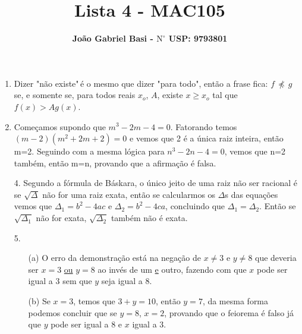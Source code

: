 \documentclass[12pt, a4paper]{article} %
\title{ \textbf{Lista 4 - MAC105}}
\date{}
\author{ \textbf{João Gabriel Basi - $\text{N}^\circ$ USP: 9793801}}
\begin{document}
\maketitle
\begin{enumerate}
\item
Dizer "não existe"$\,$é o mesmo que dizer "para todo", então a frase fica: $f\,\not\preceq\, g$ se, e somente se, para todos reais $x_o$, $A$, existe $x\geqslant x_o$ tal que $f(x) >  Ag(x)$. 
\item
Começamos supondo que $m^3-2m-4=0$. Fatorando temos $(m-2)(m^2+2m+2)=0$ e vemos que 2 é a única raiz inteira, então m=2. Seguindo com a mesma lógica para $n^3-2n-4=0$, vemos que n=2 também, então m=n, provando que a afirmação é falsa.
\item[4.]
Segundo a fórmula de Báskara, o único jeito de uma raiz não ser racional é se $\sqrt{\Delta}$ não for uma raiz exata, então se calcularmos os $\Delta$s das equações vemos que $\Delta_1=b^2-4ac$ e $\Delta_2=b^2-4ca$, concluindo que $\Delta_1=\Delta_2$. Então se $\sqrt{\Delta_1}$ não for exata, $\sqrt{\Delta_2}$ também não é exata.
\item[5.]
\begin{enumerate}
\item[(a)]
O erro da demonstração está na negação de $x\neq3$ e $y\neq8$ que deveria ser $x=3$ \underline{ou} $y=8$ ao invés de um \underline{e} outro, fazendo com que $x$ pode ser igual a $3$ sem que $y$ seja igual a $8$.
\item[(b)]
Se $x=3$, temos que $3+y=10$, então $y=7$, da mesma forma podemos concluir que se $y=8$, $x=2$, provando que o feiorema é falso já que $y$ pode ser igual a $8$ e $x$ igual a $3$.
\end{enumerate}
\end{enumerate}
\end{document}
